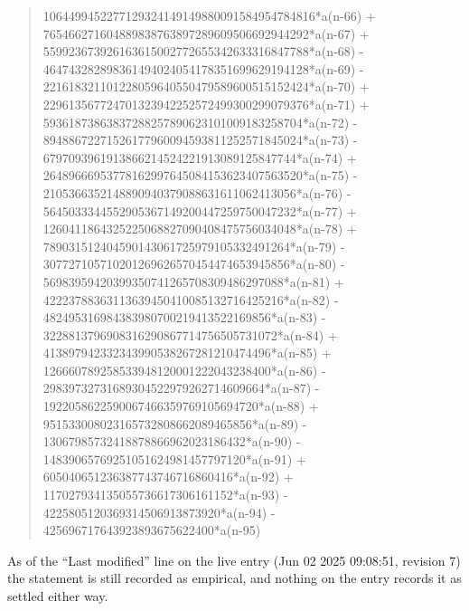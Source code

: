 \documentclass[11pt,a4paper]{article}
\theoremstyle{plain}
\theoremstyle{definition}
\begin{document}
\begin{quote}
1064499452277129324149149880091584954784816*a(n-66) + 765466271604889838763897289609506692944292*a(n-67) + 559923673926163615002772655342633316847788*a(n-68) - 464743282898361494024054178351699629194128*a(n-69) - 221618321101228059640550479589600515152424*a(n-70) + 229613567724701323942252572499300299079376*a(n-71) + 59361873863837288257890623101009183258704*a(n-72) - 89488672271526177960094593811252571845024*a(n-73) - 6797093961913866214524221913089125847744*a(n-74) + 26489666953778162997645084153623407563520*a(n-75) - 2105366352148890940379088631611062413056*a(n-76) - 5645033344552905367149200447259750047232*a(n-77) + 1260411864325225068827090408475756034048*a(n-78) + 789031512404590143061725979105332491264*a(n-79) - 307727105710201269626570454474653945856*a(n-80) - 56983959420399350741265708309486297088*a(n-81) + 42223788363113639450410085132716425216*a(n-82) - 482495316984383980700219413522169856*a(n-83) - 3228813796908316290867714756505731072*a(n-84) + 413897942332343990538267281210474496*a(n-85) + 126660789258533948120001222043238400*a(n-86) - 29839732731689304522979262714609664*a(n-87) - 1922058622590067466359769105694720*a(n-88) + 951533008023165732808662089465856*a(n-89) - 13067985732418878866962023186432*a(n-90) - 14839065769251051624981457797120*a(n-91) + 605040651236387743746716860416*a(n-92) + 117027934135055736617306161152*a(n-93) - 4225805120369314506913873920*a(n-94) - 425696717643923893675622400*a(n-95)
\end{quote}
As of the ``Last modified'' line on the live entry (Jun 02 2025 09:08:51, revision 7) the statement is
still recorded as empirical, and nothing on the entry records it as settled either way.
\end{document}
